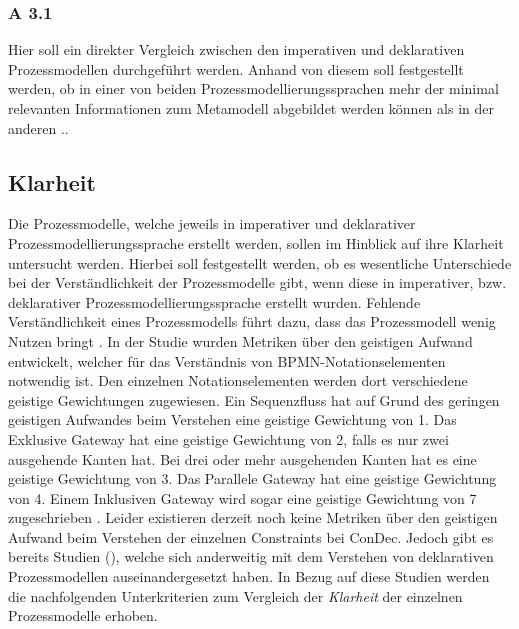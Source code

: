 \subsubsection{A 3.1}

Hier soll ein direkter Vergleich zwischen den imperativen und deklarativen Prozessmodellen durchgeführt werden. Anhand von diesem soll festgestellt werden, ob in einer von beiden Prozessmodellierungssprachen mehr der minimal relevanten Informationen zum Metamodell abgebildet werden können als in der anderen \cite{journals95, freund2007,reinshagen2009}..\newline

\subsection{Klarheit}

Die Prozessmodelle, welche jeweils in imperativer und deklarativer Prozessmodellierungssprache erstellt werden, sollen im Hinblick auf ihre Klarheit untersucht werden. Hierbei soll festgestellt werden, ob es wesentliche Unterschiede bei der Verständlichkeit der Prozessmodelle gibt, wenn diese in imperativer, bzw. deklarativer Prozessmodellierungssprache erstellt wurden. Fehlende Verständlichkeit eines Prozessmodells führt dazu, dass das Prozessmodell wenig Nutzen bringt \cite{journals95, freund2007,reinshagen2009}. \newline
In der Studie \cite{gruhn2006adopting} wurden Metriken über den geistigen Aufwand entwickelt, welcher für das Verständnis von BPMN-Notationselementen notwendig ist. Den einzelnen Notationselementen werden dort verschiedene geistige Gewichtungen zugewiesen. Ein Sequenzfluss hat auf Grund des geringen geistigen Aufwandes beim Verstehen eine geistige Gewichtung von 1. Das Exklusive Gateway hat eine geistige Gewichtung von 2, falls es nur zwei ausgehende Kanten hat. Bei drei oder mehr ausgehenden Kanten hat es eine geistige Gewichtung von 3. Das Parallele Gateway hat eine geistige Gewichtung von 4. Einem Inklusiven Gateway wird sogar eine geistige Gewichtung von 7 zugeschrieben \cite{gruhn2006adopting}.\newline
Leider existieren derzeit noch keine Metriken über den geistigen Aufwand beim Verstehen der einzelnen Constraints bei ConDec. Jedoch gibt es bereits Studien (\cite{thesis_maja,haisjackl2014understanding, sabrina933}), welche sich anderweitig mit dem Verstehen von deklarativen Prozessmodellen auseinandergesetzt haben. In Bezug auf diese Studien werden die nachfolgenden Unterkriterien zum Vergleich der \textit{Klarheit} der einzelnen Prozessmodelle erhoben.

